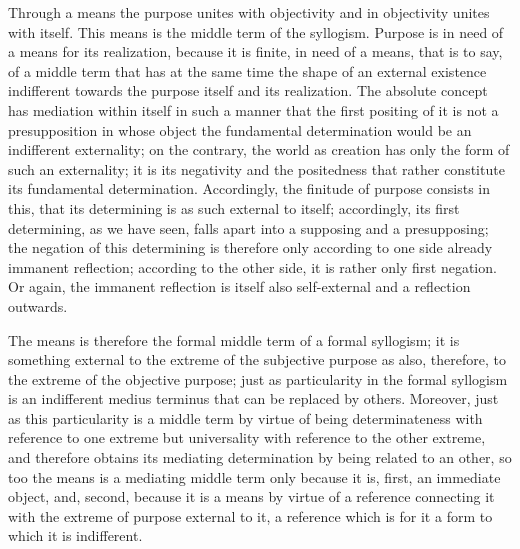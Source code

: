 Through a means the purpose unites with objectivity
and in objectivity unites with itself.
This means is the middle term of the syllogism.
Purpose is in need of a means for its realization,
because it is finite, in need of a means,
that is to say, of a middle term
that has at the same time the shape of an
external existence indifferent towards
the purpose itself and its realization.
The absolute concept has mediation
within itself in such a manner that
the first positing of it is not a
presupposition in whose object
the fundamental determination
would be an indifferent externality;
on the contrary, the world as creation has
only the form of such an externality;
it is its negativity and the positedness
that rather constitute its fundamental determination.
Accordingly, the finitude of purpose consists in this,
that its determining is as such external to itself;
accordingly, its first determining, as we have seen,
falls apart into a supposing and a presupposing;
the negation of this determining is therefore
only according to one side already immanent reflection;
according to the other side, it is rather only first negation.
Or again, the immanent reflection is itself also self-external
and a reflection outwards.

The means is therefore the
formal middle term of a formal syllogism;
it is something external to the extreme
of the subjective purpose as also,
therefore, to the extreme of the objective purpose;
just as particularity in the formal syllogism is
an indifferent medius terminus that can be replaced by others.
Moreover, just as this particularity is
a middle term by virtue of being
determinateness with reference to one extreme
but universality with reference to the other extreme,
and therefore obtains its mediating determination
by being related to an other,
so too the means is a mediating middle term
only because it is,
first, an immediate object,
and, second, because it is a means
by virtue of a reference
connecting it with the extreme
of purpose external to it,
a reference which is for it a form
to which it is indifferent.

